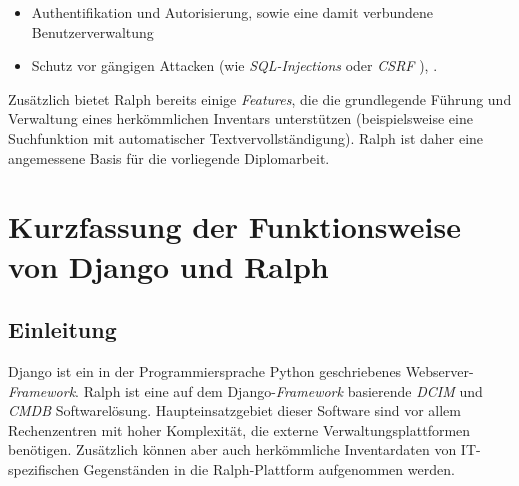 \begin{itemize}
\tightlist
\item
  Authentifikation und Autorisierung, sowie eine damit verbundene
  Benutzerverwaltung
\item
  Schutz vor gängigen Attacken (wie
  \emph{SQL-Injections}
  oder
  \emph{CSRF}
  \cite{csrf}), .
\end{itemize}

Zusätzlich bietet Ralph bereits einige
\emph{Features},
die die grundlegende Führung und Verwaltung eines herkömmlichen
Inventars unterstützen (beispielsweise eine Suchfunktion mit
automatischer Textvervollständigung). Ralph ist daher eine angemessene
Basis für die vorliegende Diplomarbeit.

\hypertarget{kurzfassung-der-funktionsweise-von-django-und-ralph}{%
\section{Kurzfassung der Funktionsweise von Django und
Ralph}\label{kurzfassung-der-funktionsweise-von-django-und-ralph}}

\hypertarget{einleitung}{%
\subsection{Einleitung}\label{einleitung}}

Django ist ein in der Programmiersprache Python geschriebenes
Webserver-\emph{Framework}.
Ralph ist eine auf dem
Django-\emph{Framework}
basierende
\emph{DCIM}
und
\emph{CMDB}
Softwarelösung. Haupteinsatzgebiet dieser Software sind vor allem
Rechenzentren mit hoher Komplexität, die externe Verwaltungsplattformen
benötigen. Zusätzlich können aber auch herkömmliche Inventardaten von
IT-spezifischen Gegenständen in die Ralph-Plattform aufgenommen werden.

